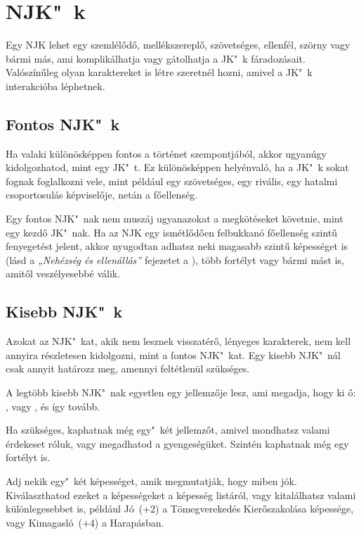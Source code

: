 \section{NJK"~k}

Egy NJK lehet egy szemlélődő, mellékszereplő, szövetséges, ellenfél, szörny vagy bármi más, ami komplikálhatja vagy gátolhatja a JK"~k fáradozásait. Valószínűleg olyan karaktereket is létre szeretnél hozni, amivel a JK"~k interakcióba léphetnek.

\subsection{Fontos NJK"~k}

Ha valaki különösképpen fontos a történet szempontjából, akkor ugyanúgy kidolgozhatod, mint egy JK"~t. Ez különösképpen helyénvaló, ha a JK"~k sokat fognak foglalkozni vele, mint például egy szövetséges, egy rivális, egy hatalmi csoportosulás képviselője, netán a főellenség.

Egy fontos NJK"~nak nem muszáj ugyanazokat a megkötéseket követnie, mint egy kezdő JK"~nak. Ha az NJK egy ismétlődően felbukkanó főellenség szintű fenyegetést jelent, akkor nyugodtan adhatsz neki magasabb szintű képességet is (lásd a \textit{„Nehézség és ellenállás”} fejezetet a ), több fortélyt vagy bármi mást is, amitől veszélyesebbé válik.

\subsection{Kisebb NJK"~k}

Azokat az NJK"~kat, akik nem lesznek visszatérő, lényeges karakterek, nem kell annyira részletesen kidolgozni, mint a fontos NJK"~kat. Egy kisebb NJK"~nál csak annyit határozz meg, amennyi feltétlenül szükséges.

A legtöbb kisebb NJK"~nak egyetlen egy jellemzője lesz, ami megadja, hogy ki ő: ,  vagy , és így tovább.

Ha szükséges, kaphatnak még egy"~két jellemzőt, amivel mondhatsz valami érdekeset róluk, vagy megadhatod a gyengeségüket. Szintén kaphatnak még egy fortélyt is.

Adj nekik egy"~két képességet, amik megmutatják, hogy miben jók. Kiválaszthatod ezeket a képességeket a képesség listáról, vagy kitalálhatsz valami különlegesebbet is, például Jó~(+2) a Tömegverekedés Kierőszakolása képessége, vagy Kimagasló~(+4) a Harapásban.

